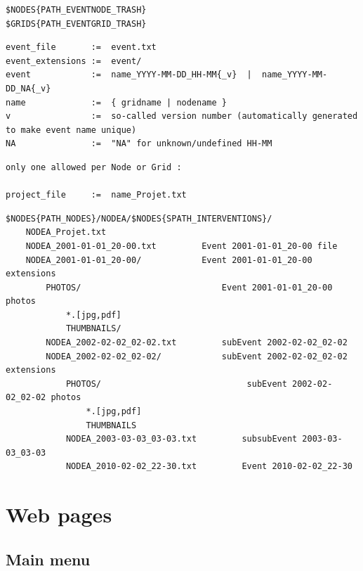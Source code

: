 \begin{lstlisting}[title=Events 'trash' directories (for deleted events)]
$NODES{PATH_EVENTNODE_TRASH}
$GRIDS{PATH_EVENTGRID_TRASH}
\end{lstlisting}

\begin{lstlisting}[title=Events files and extensions naming conventions]
event_file       :=  event.txt
event_extensions :=  event/
event            :=  name_YYYY-MM-DD_HH-MM{_v}  |  name_YYYY-MM-DD_NA{_v}  
name             :=  { gridname | nodename }
v                :=  so-called version number (automatically generated to make event name unique)
NA               :=  "NA" for unknown/undefined HH-MM
\end{lstlisting}

\begin{lstlisting}[title=Special event file: the Project]
only one allowed per Node or Grid :

project_file     :=  name_Projet.txt
\end{lstlisting}

\begin{lstlisting}[title=Unfolded example for node NODEA INTERVENTIONS]
$NODES{PATH_NODES}/NODEA/$NODES{SPATH_INTERVENTIONS}/
	NODEA_Projet.txt
	NODEA_2001-01-01_20-00.txt         Event 2001-01-01_20-00 file
	NODEA_2001-01-01_20-00/            Event 2001-01-01_20-00 extensions
		PHOTOS/                            Event 2001-01-01_20-00 photos 
			*.[jpg,pdf]                         
			THUMBNAILS/                         
		NODEA_2002-02-02_02-02.txt         subEvent 2002-02-02_02-02
		NODEA_2002-02-02_02-02/            subEvent 2002-02-02_02-02 extensions
			PHOTOS/                             subEvent 2002-02-02_02-02 photos
				*.[jpg,pdf]                         
				THUMBNAILS                          
			NODEA_2003-03-03_03-03.txt         subsubEvent 2003-03-03_03-03
			NODEA_2010-02-02_22-30.txt         Event 2010-02-02_22-30
\end{lstlisting}



\section{Web pages}



\subsection{Main menu}



